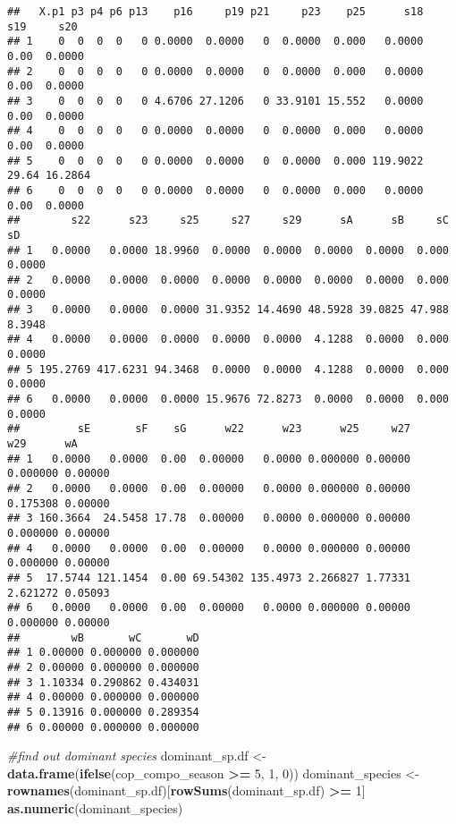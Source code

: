 \documentclass[
]{article}
\newenvironment{Shaded}{\begin{snugshade}}{\end{snugshade}}
\newcommand{\CommentTok}[1]{\textcolor[rgb]{0.56,0.35,0.01}{\textit{#1}}}
\newcommand{\DecValTok}[1]{\textcolor[rgb]{0.00,0.00,0.81}{#1}}
\newcommand{\FunctionTok}[1]{\textcolor[rgb]{0.13,0.29,0.53}{\textbf{#1}}}
\newcommand{\NormalTok}[1]{#1}
\newcommand{\OtherTok}[1]{\textcolor[rgb]{0.56,0.35,0.01}{#1}}
\newcommand{\SpecialCharTok}[1]{\textcolor[rgb]{0.81,0.36,0.00}{\textbf{#1}}}
\begin{document}
\begin{verbatim}
##   X.p1 p3 p4 p6 p13    p16     p19 p21     p23    p25      s18   s19     s20
## 1    0  0  0  0   0 0.0000  0.0000   0  0.0000  0.000   0.0000  0.00  0.0000
## 2    0  0  0  0   0 0.0000  0.0000   0  0.0000  0.000   0.0000  0.00  0.0000
## 3    0  0  0  0   0 4.6706 27.1206   0 33.9101 15.552   0.0000  0.00  0.0000
## 4    0  0  0  0   0 0.0000  0.0000   0  0.0000  0.000   0.0000  0.00  0.0000
## 5    0  0  0  0   0 0.0000  0.0000   0  0.0000  0.000 119.9022 29.64 16.2864
## 6    0  0  0  0   0 0.0000  0.0000   0  0.0000  0.000   0.0000  0.00  0.0000
##        s22      s23     s25     s27     s29      sA      sB     sC     sD
## 1   0.0000   0.0000 18.9960  0.0000  0.0000  0.0000  0.0000  0.000 0.0000
## 2   0.0000   0.0000  0.0000  0.0000  0.0000  0.0000  0.0000  0.000 0.0000
## 3   0.0000   0.0000  0.0000 31.9352 14.4690 48.5928 39.0825 47.988 8.3948
## 4   0.0000   0.0000  0.0000  0.0000  0.0000  4.1288  0.0000  0.000 0.0000
## 5 195.2769 417.6231 94.3468  0.0000  0.0000  4.1288  0.0000  0.000 0.0000
## 6   0.0000   0.0000  0.0000 15.9676 72.8273  0.0000  0.0000  0.000 0.0000
##         sE       sF    sG      w22      w23      w25     w27      w29      wA
## 1   0.0000   0.0000  0.00  0.00000   0.0000 0.000000 0.00000 0.000000 0.00000
## 2   0.0000   0.0000  0.00  0.00000   0.0000 0.000000 0.00000 0.175308 0.00000
## 3 160.3664  24.5458 17.78  0.00000   0.0000 0.000000 0.00000 0.000000 0.00000
## 4   0.0000   0.0000  0.00  0.00000   0.0000 0.000000 0.00000 0.000000 0.00000
## 5  17.5744 121.1454  0.00 69.54302 135.4973 2.266827 1.77331 2.621272 0.05093
## 6   0.0000   0.0000  0.00  0.00000   0.0000 0.000000 0.00000 0.000000 0.00000
##        wB       wC       wD
## 1 0.00000 0.000000 0.000000
## 2 0.00000 0.000000 0.000000
## 3 1.10334 0.290862 0.434031
## 4 0.00000 0.000000 0.000000
## 5 0.13916 0.000000 0.289354
## 6 0.00000 0.000000 0.000000
\end{verbatim}

\begin{Shaded}
\begin{Highlighting}[]
\CommentTok{\#find out dominant species}
\NormalTok{dominant\_sp.df }\OtherTok{\textless{}{-}} \FunctionTok{data.frame}\NormalTok{(}\FunctionTok{ifelse}\NormalTok{(cop\_compo\_season }\SpecialCharTok{\textgreater{}=} \DecValTok{5}\NormalTok{, }\DecValTok{1}\NormalTok{, }\DecValTok{0}\NormalTok{))}
\NormalTok{dominant\_species }\OtherTok{\textless{}{-}} \FunctionTok{rownames}\NormalTok{(dominant\_sp.df)[}\FunctionTok{rowSums}\NormalTok{(dominant\_sp.df) }\SpecialCharTok{\textgreater{}=} \DecValTok{1}\NormalTok{]}
\FunctionTok{as.numeric}\NormalTok{(dominant\_species)}
\end{Highlighting}
\end{Shaded}
\end{document}
